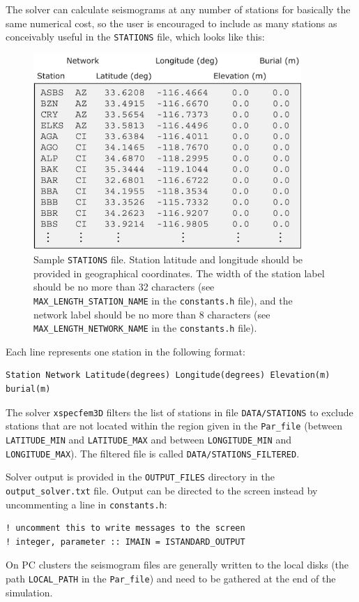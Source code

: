 The solver can calculate seismograms at any number of stations for
basically the same numerical cost, so the user is encouraged to include
as many stations as conceivably useful in the \texttt{STATIONS} file,
which looks like this:
%
\begin{figure}[H]
\begin{centering}
\includegraphics[width=4in]{figures/STATIONS_basin_explained.jpg}
\par
\end{centering}
\caption{Sample \texttt{STATIONS} file. Station latitude and longitude should
be provided in geographical coordinates. The width of the station
label should be no more than 32 characters (see \texttt{MAX\_LENGTH\_STATION\_NAME}
in the \texttt{constants.h} file), and the network label should be
no more than 8 characters (see \texttt{MAX\_LENGTH\_NETWORK\_NAME}
in the \texttt{constants.h} file).}
\label{fig:Sample-STATIONS-file.}
\end{figure}



Each line represents one station in the following format:
{\small
\begin{verbatim}
Station Network Latitude(degrees) Longitude(degrees) Elevation(m) burial(m)
\end{verbatim}
}
The solver \texttt{xspecfem3D} filters the list of stations in file
\texttt{DATA/STATIONS} to exclude stations that are not located within
the region given in the \texttt{Par\_file} (between \texttt{LATITUDE\_MIN}
and \texttt{LATITUDE\_MAX} and between \texttt{LONGITUDE\_MIN} and
\texttt{LONGITUDE\_MAX}). The filtered file is called \texttt{DATA/STATIONS\_FILTERED}.

Solver output is provided in the \texttt{OUTPUT\_FILES} directory
in the \texttt{output\_solver.txt} file. Output can be directed to
the screen instead by uncommenting a line in \texttt{constants.h}:
\begin{verbatim}
! uncomment this to write messages to the screen
! integer, parameter :: IMAIN = ISTANDARD_OUTPUT
\end{verbatim}
On PC clusters the seismogram files are generally written to the local
disks (the path \texttt{LOCAL\_PATH} in the \texttt{Par\_file}) and
need to be gathered at the end of the simulation.

